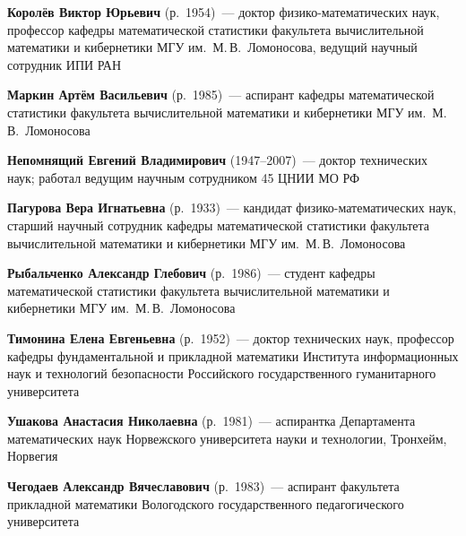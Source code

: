 \begin{multicols}{2}
\noindent
\textbf{Королёв Виктор Юрьевич} (р.\ 1954)~---  доктор физико-математических наук, 
профессор кафедры математической статистики факультета вычислительной математики 
и кибернетики МГУ им.\ М.\,В.~Ломоносова, 
ведущий научный сотрудник ИПИ РАН

\vspace*{11pt}

\noindent
\textbf{Маркин Артём Васильевич} (р.\ 1985)~---  аспирант кафедры математической 
статистики факультета вычислительной математики и кибернетики 
МГУ им.\ М.\,В.~Ломоносова


\noindent
\textbf{Непомнящий Евгений Владимирович} (1947--2007)~---  доктор технических наук; работал 
ведущим научным сотрудником 45 ЦНИИ МО РФ

\vspace*{6pt}

\noindent
\textbf{Пагурова Вера Игнатьевна} (р.\ 1933)~---  кандидат физико-математических наук, 
старший научный сотрудник кафедры математической статистики факультета 
вычислительной математики и кибернетики МГУ им.\ М.\,В.~Ломоносова

\vspace*{6pt}

\noindent
\textbf{Рыбальченко Александр Глебович} (р.\ 1986)~---  студент кафедры 
математической статистики факультета вычислительной математики и кибернетики 
МГУ им.\ М.\,В.~Ломоносова

\vspace*{6pt}

\noindent
\textbf{Тимонина Елена Евгеньевна} (р.\ 1952)~---  доктор технических наук, профессор 
кафедры фунда\-мен\-тальной и прикладной математики Института информационных наук и 
технологий безопасности Российского государственного гуманитарного университета

\vspace*{6pt}

\noindent
\textbf{Ушакова Анастасия Николаевна} (р.\ 1981)~---  аспирантка Департамента 
математических наук Норвежского университета науки и технологии, Тронхейм, 
Норвегия


\vspace*{6pt}

\noindent
\textbf{Чегодаев Александр  Вячеславович} (р.\ 1983)~---  аспирант факультета прикладной 
математики Вологодского государственного педагогического университета


\end{multicols}

